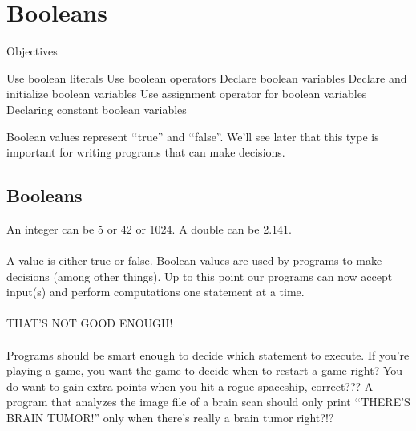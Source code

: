 \chapter{Booleans}
Objectives
\begin{tightlist}
\li Use boolean literals
\li Use boolean operators
\li Declare boolean variables
\li Declare and initialize boolean variables
\li Use assignment operator for boolean variables
\li Declaring constant boolean variables
\end{tightlist}

Boolean values represent \lq\lq true'' and \lq\lq false''. We'll see later that this type
is important for writing programs that can make decisions.
\newpage\section{Booleans}

An integer can be 5 or 42 or 1024. A double can be 2.141.\\\\

A \textbf{} value is either true or false. Boolean values are used by programs to make decisions (among other things). Up to this point our
programs can now accept input(s) and perform computations one
statement at a time.\\\\
THAT'S NOT GOOD ENOUGH!\\\\
Programs should be smart enough to decide which statement to execute.
If you're playing a game, you want the game to decide when to restart a
game right? You do want to gain extra points when you hit a rogue
spaceship, correct??? A program that analyzes the image file of a brain
scan should only print \lq\lq THERE'S BRAIN TUMOR!'' only when there's
really a brain tumor right?!?\\\\

